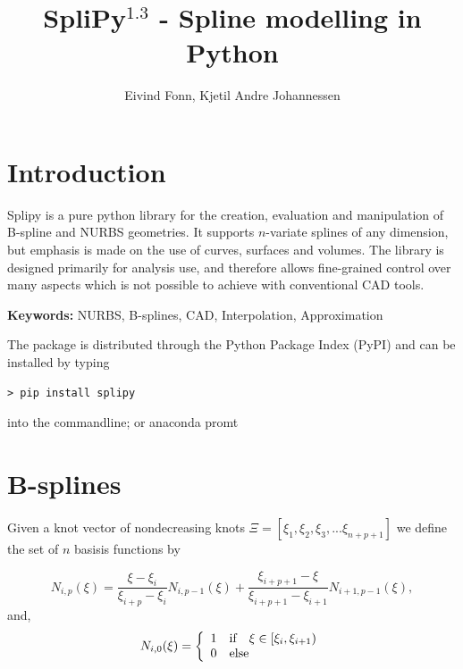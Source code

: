 \documentclass[landscape]{sintefposter}
\title{SpliPy$^{1.3}$ - Spline modelling in Python}
\author{Eivind Fonn, Kjetil Andre Johannessen }
\institute{SINTEF Digital, Dept. of Mathematics and Cybernetics, Trondheim, Norway}
\begin{document}
\maketitle

\begin{multicols}{3}
\section{Introduction}
\begin{tcolorbox}[colback=sintefblue!10!white,colframe=sintefblue,title=Abstract]
  Splipy is a pure python library for the creation, evaluation and manipulation of B-spline and NURBS geometries.
  It supports $n$-variate splines of any dimension, but emphasis is made on the use of curves, surfaces and volumes.
  The library is designed primarily for analysis use, and therefore allows fine-grained control over many aspects which is not possible to achieve with conventional CAD tools.
\end{tcolorbox}
\textbf{Keywords:} NURBS, B-splines, CAD, Interpolation, Approximation
\vspace{1cm}

\begin{tcolorbox}[colback=white,colframe=sintefblue,title=Installation]
  The package is distributed through the Python Package Index (PyPI) and can be installed by typing
  \begin{tcolorbox}[colback=sinteflightgrey]
  \begin{verbatim}
> pip install splipy \end{verbatim}
  \end{tcolorbox}
  into the commandline; or anaconda promt
\end{tcolorbox}

\section{B-splines}
Given a knot vector of nondecreasing knots $\Xi=[\xi_1, \xi_2, \xi_3, ... \xi_{n+p+1}]$ we define the set of $n$ basisis functions by
\begin{tcolorbox}[colback=sintefblue!10!white,colframe=sintefblue,title=The basis]
  \begin{equation}
    \label{eq:bspline}
    N_{i,p}(\xi) = \frac{\xi - \xi_i}{\xi_{i+p}-\xi_i}N_{i,p-1}(\xi) + \frac{\xi_{i+p+1}-\xi}{\xi_{i+p+1}-\xi_{i+1}}N_{i+1,p-1}(\xi),
  \end{equation}
  and,
  \begin{equation}
    \label{eq:bspline-start}
    N_{i,0}(\xi) = \left\{
    \begin{array}{ll}
      1  &  $if $ \ \ \xi \in [\xi_i, \xi_{i+1}) \\
      0  &  $else$
    \end{array}
    \right.
  \end{equation}
\end{tcolorbox}


\end{multicols}
\end{document}
